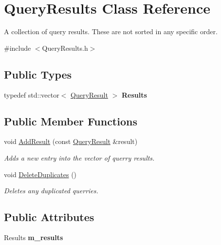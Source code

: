 \hypertarget{classQueryResults}{}\section{Query\+Results Class Reference}
\label{classQueryResults}


A collection of query results. These are not sorted in any specific order.  




{\ttfamily \#include $<$Query\+Results.\+h$>$}

\subsection*{Public Types}
\begin{DoxyCompactItemize}
\item 
\mbox{\label{classQueryResults_a8791b637b315b8a5c06142eba332ad8b}} 
typedef std\+::vector$<$ \hyperlink{classQueryResult}{Query\+Result} $>$ {\bfseries Results}
\end{DoxyCompactItemize}
\subsection*{Public Member Functions}
\begin{DoxyCompactItemize}
\item 
void \hyperlink{classQueryResults_ab267e6a702a708529aa39eb140f52bd3}{Add\+Result} (const \hyperlink{classQueryResult}{Query\+Result} \&result)
\begin{DoxyCompactList}\small\item\em Adds a new entry into the vector of querry results. \end{DoxyCompactList}\item 
\mbox{\label{classQueryResults_a57a126b24c884f91b25a6a439b7ddf5e}} 
void \hyperlink{classQueryResults_a57a126b24c884f91b25a6a439b7ddf5e}{Delete\+Duplicates} ()
\begin{DoxyCompactList}\small\item\em Deletes any duplicated querries. \end{DoxyCompactList}\end{DoxyCompactItemize}
\subsection*{Public Attributes}
\begin{DoxyCompactItemize}
\item 
\mbox{\label{classQueryResults_a3145d22c7a0bbcb72abebf0a95f21f86}} 
Results {\bfseries m\+\_\+results}
\end{DoxyCompactItemize}


